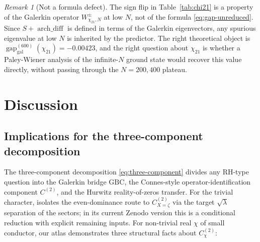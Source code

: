 \documentclass[a4paper,10pt,twocolumn]{article}
\theoremstyle{definition}
\theoremstyle{remark}
\newtheorem{remark}[theorem]{Remark}
\newcommand{\gap}{\operatorname{gap}}
\newcommand{\chifn}{\chi}
\newcommand{\archdiff}{\operatorname{arch\_diff}}
\begin{document}
\begin{remark}[Not a formula defect]
\label{rem:chi21-not-defect}
The sign flip in Table~\ref{tab:chi21} is a property of the
Galerkin operator $W^\pm_{\chifn_{21},N}$ at low $N$, not of the
formula \eqref{eq:gap-unreduced}. Since $S+\archdiff$ is defined
in terms of the Galerkin eigenvectors, any spurious eigenvalue at
low $N$ is inherited by the predictor. The right theoretical
object is $\gap_{\mathrm{gal}}^{(600)}(\chifn_{21})=-0.00423$,
and the right question about $\chifn_{21}$ is whether a
Paley-Wiener analysis of the infinite-$N$ ground state would recover
this value directly, without passing through the $N=200,400$
plateau.
\end{remark}

\section{Discussion}
\label{sec:discussion}

\subsection{Implications for the three-component decomposition}
\label{sec:discussion-three-component}

The three-component decomposition \eqref{eq:three-component} divides
any RH-type question into the Galerkin bridge $\mathrm{GBC}$, the
Connes-style operator-identification component $C^{(2)}$, and the
Hurwitz reality-of-zeros transfer. For the trivial character,
\cite{RH_II} isolates the even-dominance route to
$C^{(2)}_{X=\zeta}$ via the target $\sqrt{\lambda}$ separation of the
sectors; in its current Zenodo version this is a conditional reduction
with explicit remaining inputs. For non-trivial real $\chifn$ of small
conductor, our atlas demonstrates three structural facts about
$C^{(2)}_{\chifn}$:
\end{document}
